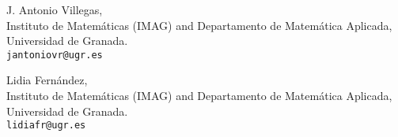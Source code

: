 \documentclass[11pt,a4paper]{amsart}
\begin{document}


\bigskip


{\footnotesize\noindent J. Antonio Villegas,\\
Instituto de Matemáticas (IMAG) and Departamento de Matemática Aplicada,\\
Universidad de Granada.\\
{\tt jantoniovr@ugr.es}

\bigskip

\noindent Lidia Fernández,\\
Instituto de Matemáticas (IMAG) and Departamento de Matemática Aplicada,\\
Universidad de Granada.\\
{\tt lidiafr@ugr.es}

\bigskip


\mbox{ }}
\end{document}
